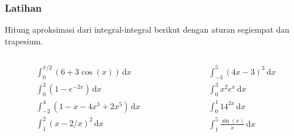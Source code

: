 \begin{frame}
\frametitle{Latihan}
    
Hitung aproksimasi dari integral-integral berikut dengan aturan segiempat dan trapesium.
    
\begin{columns}

\begin{column}{0.5\textwidth}
\begin{align*}
& \int_{0}^{\pi/2} (6 + 3\cos(x)) \, \mathrm{d}x \\
& \int_{0}^{3} (1 - e^{-2x}) \, \mathrm{d}x \\
& \int_{-2}^{4} (1 - x - 4x^3 + 2x^5) \, \mathrm{d}x \\
& \int_{1}^{2} (x - 2/x)^2 \, \mathrm{d}x
\end{align*}      
\end{column}

\begin{column}{0.5\textwidth}
\begin{align*}
& \int_{-3}^{5} (4x - 3)^3 \, \mathrm{d}x \\
& \int_{0}^{3} x^2 e^x \, \mathrm{d}x \\
& \int_{0}^{1} 14^{2x} \, \mathrm{d}x \\
& \int_{1}^{5} \frac{\sin(x)}{x}\,\mathrm{d}x
\end{align*}
\end{column}
    
\end{columns}
    
\end{frame}